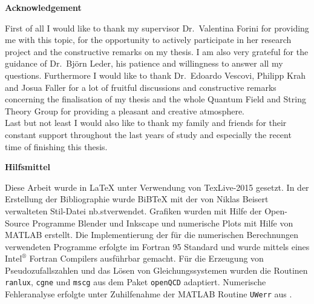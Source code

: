 \begin{center}
{\sffamily \bfseries\Large Acknowledgement}\\
\end{center}%
\vspace{1cm}
%
First of all I would like to thank my supervisor Dr.~Valentina Forini for providing me with this topic, for the opportunity to actively participate in her research project and the constructive remarks on my thesis. I am also very grateful for the guidance of Dr.~Björn Leder, his patience and willingness to answer all my questions. Furthermore I would like to thank Dr.~Edoardo Vescovi, Philipp Krah and Josua Faller for a lot of fruitful discussions and constructive remarks concerning the finalisation of my thesis and the whole Quantum Field and String Theory Group for providing a pleasant and creative atmosphere.\\
Last but not least I would also like to thank my family and friends for their constant support throughout the last years of study and especially the recent time of finishing this thesis.\\
%
%
%
\vspace{3cm}
%
\begin{center}
{\sffamily \bfseries\Large Hilfsmittel}\\
\end{center}%
\vspace{1cm}
Diese Arbeit wurde in \LaTeX{ } unter Verwendung von TexLive-2015 gesetzt. In der Erstellung der Bibliographie wurde BiBTeX mit der von Niklas Beisert verwalteten Stil-Datei \glqq nb.st\grqq{ }verwendet. Grafiken wurden mit Hilfe der Open-Source Programme Blender und Inkscape und numerische Plots mit Hilfe von MATLAB erstellt. Die Implementierung der für die numerischen Berechnungen verwendeten Programme erfolgte im {\sc Fortran 95} Standard und wurde mittels eines $\text{Intel}^{\circledR}$ Fortran Compilers ausführbar gemacht. Für die Erzeugung von Pseudozufallszahlen und das Lösen von Gleichungssystemen wurden die Routinen \texttt{ranlux}, \texttt{cgne} und \texttt{mscg} aus dem Paket \texttt{openQCD} adaptiert. Numerische Fehleranalyse erfolgte unter Zuhilfenahme der MATLAB Routine \texttt{UWerr} aus \cite{Wolff:2003sm}.